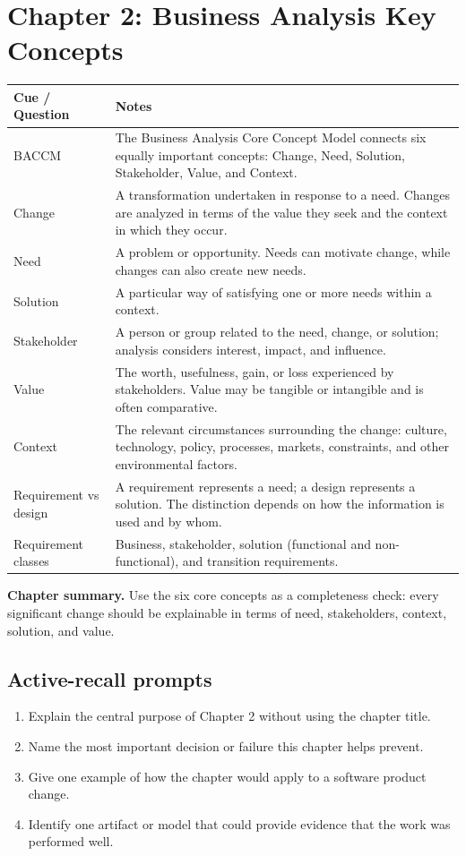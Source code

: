 \documentclass[11pt]{article}
\begin{document}
\section{Chapter 2: Business Analysis Key Concepts}
\begin{longtable}{L{0.26\textwidth} L{0.64\textwidth}}
\toprule
\textbf{Cue / Question} & \textbf{Notes}\\
\midrule
\endhead
BACCM & The Business Analysis Core Concept Model connects six equally important concepts: Change, Need, Solution, Stakeholder, Value, and Context.\\
Change & A transformation undertaken in response to a need. Changes are analyzed in terms of the value they seek and the context in which they occur.\\
Need & A problem or opportunity. Needs can motivate change, while changes can also create new needs.\\
Solution & A particular way of satisfying one or more needs within a context.\\
Stakeholder & A person or group related to the need, change, or solution; analysis considers interest, impact, and influence.\\
Value & The worth, usefulness, gain, or loss experienced by stakeholders. Value may be tangible or intangible and is often comparative.\\
Context & The relevant circumstances surrounding the change: culture, technology, policy, processes, markets, constraints, and other environmental factors.\\
Requirement vs design & A requirement represents a need; a design represents a solution. The distinction depends on how the information is used and by whom.\\
Requirement classes & Business, stakeholder, solution (functional and non-functional), and transition requirements.\\
\bottomrule
\end{longtable}
\begin{keybox}\textbf{Chapter summary.} Use the six core concepts as a completeness check: every significant change should be explainable in terms of need, stakeholders, context, solution, and value.\end{keybox}
\subsection*{Active-recall prompts}
\begin{enumerate}
\item Explain the central purpose of Chapter 2 without using the chapter title.
\item Name the most important decision or failure this chapter helps prevent.
\item Give one example of how the chapter would apply to a software product change.
\item Identify one artifact or model that could provide evidence that the work was performed well.
\end{enumerate}
\end{document}
